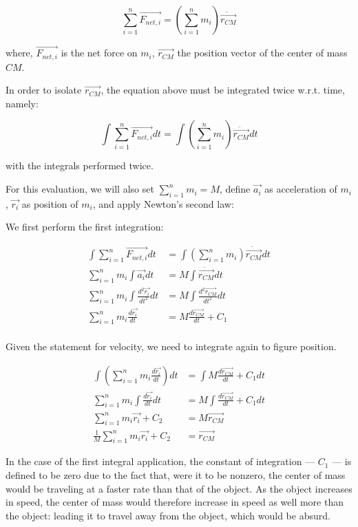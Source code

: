 \documentclass[letterpaper]{article}
\begin{document}
\begin{equation}
\sum^n_{i=1} \vec{F_{net,i}} = (\sum^n_{i=1} m_i) \ddot{\vec{r_{CM}}}
\end{equation}

where, \(\vec{F_{net,i}}\) is the net force on \(m_i\), \(\vec{r_{CM}}\) the position vector of the center of mass \(CM\).

In order to isolate \(\vec{r_{CM}}\), the equation above must be integrated twice w.r.t. time, namely:

\begin{equation}
\int \sum^n_{i=1} \vec{F_{net,i}} dt = \int (\sum^n_{i=1} m_i) \ddot{\vec{r_{CM}}} dt
\end{equation}

with the integrals performed twice.


For this evaluation, we will also set \(\sum^n_{i=1} m_i = M\), define \(\vec{a_i}\) as acceleration of \(m_i\), \(\vec{r_i}\) as position of \(m_i\), and apply Newton's second law:

We first perform the first integration:

\begin{align}
\int \sum^n_{i=1} \vec{F_{net,i}} dt &= \int (\sum^n_{i=1} m_i) \ddot{\vec{r_{CM}}} dt \\
\sum^n_{i=1} m_i \int \vec{a_i} dt &= M \int \ddot{\vec{r_{CM}}} dt \\
\sum^n_{i=1} m_i \int \frac{d^2\vec{r_i}}{dt^2} dt &= M \int \frac{d^2\vec{r_{CM}}}{dt^2} dt \\
\sum^n_{i=1} m_i \frac{d\vec{r_i}}{dt} &= M \frac{d\vec{r_{CM}}}{dt} + C_1 \\
\end{align}

Given the statement for velocity, we need to integrate again to figure position.

\begin{align}
\int (\sum^n_{i=1} m_i \frac{d\vec{r_i}}{dt}) dt &= \int M \frac{d\vec{r_{CM}}}{dt} + C_1 dt \\
\sum^n_{i=1} m_i \int \frac{d\vec{r_i}}{dt} dt &= M \int \frac{d\vec{r_{CM}}}{dt} + C_1 dt \\
\sum^n_{i=1} m_i \vec{r_i} + C_2 &= M \vec{r_{CM}} \\
\frac{1}{M} \sum^n_{i=1} m_i \vec{r_i} + C_2  &= \vec{r_{CM}}
\end{align}

In the case of the first integral application, the constant of integration --- \(C_1\) --- is defined to be zero due to the fact that, were it to be nonzero, the center of mass would be traveling at a faster rate than that of the object. As the object increases in speed, the center of mass would therefore increase in speed as well more than the object: leading it to travel away from the object, which would be absurd.
\end{document}

